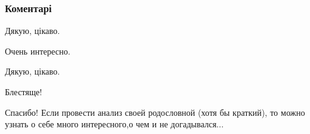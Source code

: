  
 
 
 
 
\subsubsection{Коментарі}
\label{sec:31_07_2021.fb.steckov_jurij.1.ukrainstvo_amosov.cmt}

\begin{itemize}
 
Дякую, цікаво.

 
Очень интересно.

 
Дякую, цікаво.

 
Блестяще!

 
Спасибо! Если провести анализ своей родословной (хотя бы краткий), то можно узнать о себе много интересного,о чем и не догадывался...


\end{itemize}
